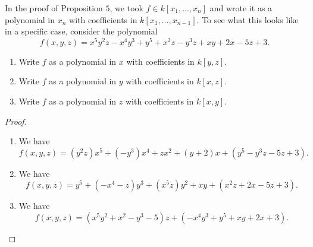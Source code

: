 \begin{exercise}{5}
In the proof of Proposition $5$, we took $f\in k[x_1,...,x_n]$ and wrote it as a polynomial in $x_n$ with coefficients in $k[x_1,...,x_{n-1}]$. To see what this looks like in a specific case, consider the polynomial
$$f(x,y,z) = x^5 y^2 z - x^4 y^3 + y^5 + x^2 z - y^3 z + xy + 2x - 5z + 3.$$
\begin{enumerate}
    \item Write $f$ as a polynomial in $x$ with coefficients in $k[y,z]$.
    \item Write $f$ as a polynomial in $y$ with coefficients in $k[x,z]$.
    \item Write $f$ as a polynomial in $z$ with coefficients in $k[x,y]$.
\end{enumerate}
\end{exercise}
\begin{proof}
    \begin{enumerate}
        \item We have
        $$f(x,y,z) = (y^2 z)x^5 + (-y^3)x^4 + z x^2 + (y + 2)x + (y^5 - y^3 z - 5z + 3).$$
        \item We have
        $$f(x,y,z) = y^5 + (-x^4 - z)y^3 + (x^5 z)y^2 + xy + (x^2 z + 2x - 5z + 3).$$
        \item We have
        $$f(x,y,z) = (x^5 y^2 + x^2 - y^3 - 5)z + (-x^4y^3 + y^5 +xy + 2x + 3).$$
    \end{enumerate}
\end{proof}

